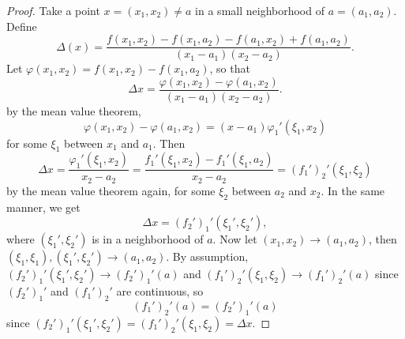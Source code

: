 \begin{proof}
  Take a point $x = (x_1, x_2) \ne a$ in a small neighborhood
  of $a = (a_1, a_2)$. Define
  \[
    \Delta(x) = \frac{f(x_1, x_2) - f(x_1, a_2) - f(a_1, x_2) + f(a_1, a_2)}{(x_1 - a_1)(x_2 - a_2)}.
  \]
  Let $\varphi(x_1, x_2) = f(x_1, x_2) - f(x_1, a_2)$, so
  that
  \[
    \Delta x = \frac{\varphi(x_1, x_2) - \varphi(a_1, x_2)}{(x_1 - a_1)(x_2 - a_2)}
  .\]
  by the mean value theorem,
  \[
    \varphi(x_1, x_2) - \varphi(a_1, x_2)
    = (x - a_1) \varphi_1'(\xi_1, x_2)
  \]
  for some $\xi_1$ between $x_1$ and $a_1$. Then
  \[
  \Delta x
  = \frac{\varphi_1'(\xi_1, x_2)}{x_2 - a_2}
  = \frac{f_1'(\xi_1, x_2) - f_1'(\xi_1, a_2)}{x_2 - a_2}
  = (f_1')_2'(\xi_1, \xi_2)
  \]
  by the mean value theorem again, for some
  $\xi_2$ between $a_2$ and $x_2$. In the same manner, we
  get \[\Delta x = (f_2')_1'(\xi_1', \xi_2'),\]
  where
  $(\xi_1', \xi_2')$ is in a neighborhood of $a$.
  Now let $(x_1, x_2) \to (a_1, a_2)$, then
  $(\xi_1, \xi_1), (\xi_1', \xi_2') \to (a_1, a_2)$.
  By assumption, $(f_2')_1'(\xi_1', \xi_2') \to (f_2')_1'(a)$ and
  $(f_1')_2'(\xi_1, \xi_2) \to (f_1')_2'(a)$ since
  $(f_2')_1'$ and $(f_1')_2'$ are continuous, so
  \[
    (f_1')_2'(a) = (f_2')_1'(a)
  \]
  since $(f_2')_1'(\xi_1', \xi_2') = (f_1')_2'(\xi_1, \xi_2) = \Delta x$.
\end{proof}
